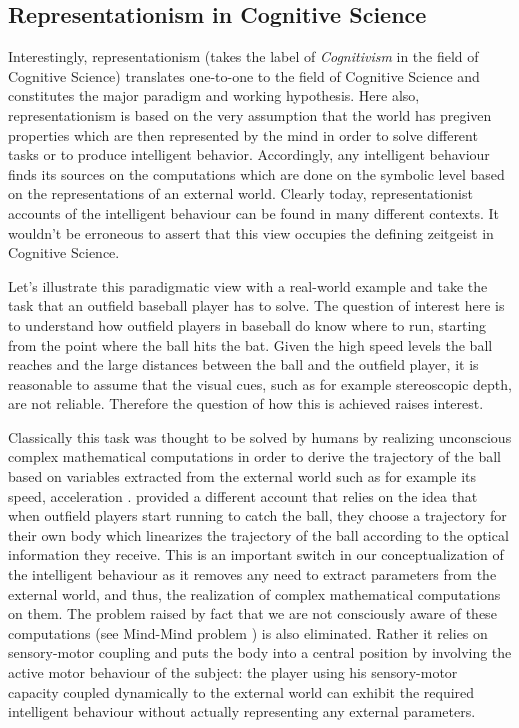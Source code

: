 \subsection{Representationism in Cognitive Science}

Interestingly, representationism (takes the label of \textit{Cognitivism}
in the field of Cognitive Science) translates one-to-one to the field of
Cognitive Science and constitutes the major paradigm and working
hypothesis. Here also, representationism is based on the very assumption
that the world has pregiven properties which are then represented by the
mind in order to solve different tasks or to produce intelligent behavior.
Accordingly, any intelligent behaviour finds its sources on the
computations which are done on the symbolic level based on the
representations of an external world. Clearly today, representationist
accounts of the intelligent behaviour can be found in many different
contexts. It wouldn't be erroneous to assert that this view occupies the
defining zeitgeist in Cognitive Science.



Let's illustrate this paradigmatic view with a real-world example and take
the task that an outfield baseball player has to solve. The question of
interest here is to understand how outfield players in baseball do know
where to run, starting from the point where the ball hits the bat. Given
the high speed levels the ball reaches and the large distances between the
ball and the outfield player, it is reasonable to assume that the visual
cues, such as for example stereoscopic depth, are not reliable. Therefore
the question of how this is achieved raises interest. 


Classically this task was thought to be solved by humans by realizing
unconscious complex mathematical computations in order to derive the
trajectory of the ball based on variables extracted from the external world
such as for example its speed, acceleration \citep{mcleod1993a}.
\cite{mcbeath1995a} provided a different account that relies on the idea
that when outfield players start running to catch the ball, they choose a
trajectory for their own body which linearizes the trajectory of the ball
according to the optical information they receive. This is an important
switch in our conceptualization of the intelligent behaviour as it removes
any need to extract parameters from the external world, and thus, the
realization of complex mathematical computations on them. The problem
raised by fact that we are not consciously aware of these computations (see
Mind-Mind problem \citep{Jackendoff1987a}) is also eliminated. Rather it
relies on sensory-motor coupling and puts the body into a central position
by involving the active motor behaviour of the subject: the player using
his sensory-motor capacity coupled dynamically to the external world can
exhibit the required intelligent behaviour without actually representing
any external parameters.


